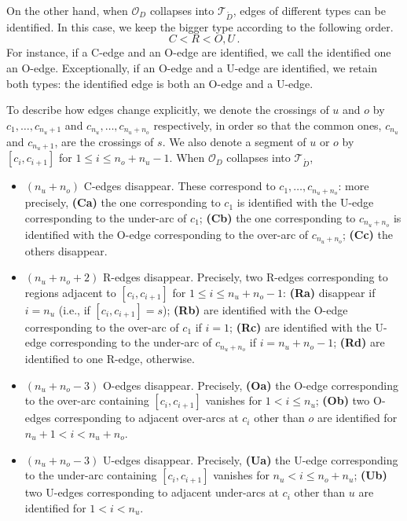 \documentclass[12pt,reqno]{amsart}
\theoremstyle{definition}
\def\calO{\mathcal O}
\def\calT{\mathcal T}
\renewcommand{\Ddot}{\mathring{D}}
\begin{document}
On the other hand, when $\calO_D$ collapses into $\calT_{\Ddot}$,
edges of different types can be identified. In this case, we keep the bigger
type according to the following order.
\begin{equation*}
C<  R < O , U \,.
\end{equation*}
For instance, if a C-edge and an O-edge are identified, we call the identified
one an O-edge. Exceptionally, if an O-edge and a U-edge are identified, we
retain both types: the identified edge is both an O-edge and a U-edge. 

To describe how edges change explicitly, we denote the crossings of $u$
and $o$ by $c_1,\ldots,c_{n_u + 1}$ and $c_{n_u},\ldots, c_{n_u+n_o}$
respectively, in order so that the common ones, $c_{n_u}$ and
$c_{n_u+1}$, are the crossings of $s$.  We also denote a segment of $u$ or $o$ by
$[c_i,c_{i+1}]$ for $1 \leq i \leq n_o+n_u-1$. 
When $\calO_D$ collapses into $\calT_{\Ddot}$,
\begin{itemize}
\item $(n_u + n_o)$ C-edges disappear. These correspond to
  $c_1, \ldots, c_{n_u + n_o}$: more precisely, 
\subitem \textbf{(Ca)} the one corresponding to $c_1$ is identified with the
U-edge corresponding to the under-arc of $c_1$; 
\subitem \textbf{(Cb)} the one  corresponding to $c_{n_u+n_o}$ is identified
with the O-edge corresponding to the over-arc of  $c_{n_u+n_o}$; 
\subitem \textbf{(Cc)} the others disappear.  
\smallskip

\item $(n_u+n_o+2)$ R-edges disappear. Precisely, two R-edges
corresponding to regions adjacent to $[c_i,c_{i+1}]$ for 
$1 \leq i \leq n_u+n_o-1$: 
\subitem \textbf{(Ra)} disappear if $i=n_u$ (i.e., if $[c_i,c_{i+1}]=s$); 
\subitem \textbf{(Rb)} are identified with the O-edge corresponding to the
over-arc of $c_1$ if $i=1$;
\subitem \textbf{(Rc)} are identified with the U-edge corresponding to the under-arc
of $c_{n_u+n_o}$ if $i=n_u + n_o -1$;
\subitem \textbf{(Rd)} are identified to one R-edge, otherwise.  
\smallskip

\item $(n_u + n_o -3)$ O-edges disappear. Precisely,
\subitem \textbf{(Oa)} the O-edge corresponding to the over-arc containing
$[c_i, c_{i+1}]$  vanishes for $1 < i \leq n_u$; 
\subitem \textbf{(Ob)} two O-edges corresponding to adjacent over-arcs at
$c_i$ other than $o$ are identified for $n_u+1 < i  < n_{u} + n_{o}$. 
\smallskip

\item $(n_u + n_o -3)$ U-edges disappear. Precisely, 
\subitem \textbf{(Ua)} the U-edge corresponding to the under-arc containing
$[c_i, c_{i+1}]$ vanishes for $n_u < i \leq n_o+n_u$; 
\subitem \textbf{(Ub)} two U-edges corresponding to adjacent under-arcs at
$c_i$ other than $u$ are identified for $1 < i  < n_{u}$.
\end{itemize}
\end{document}
